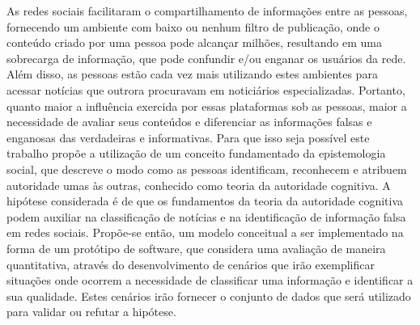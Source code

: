 \begin{resumo}

As redes sociais facilitaram o compartilhamento de informações entre as pessoas, fornecendo um ambiente com baixo ou nenhum filtro de publicação, onde o conteúdo criado por uma pessoa pode alcançar milhões, resultando em uma sobrecarga de informação, que pode confundir e/ou enganar os usuários da rede. Além disso, as pessoas estão cada vez mais utilizando estes ambientes para acessar notícias que outrora procuravam em noticiários especializadas. Portanto, quanto maior a influência exercida por essas plataformas sob as pessoas, maior a necessidade de avaliar seus conteúdos e diferenciar as informações falsas e enganosas das verdadeiras e informativas. Para que isso seja possível este trabalho propõe a utilização de um conceito fundamentado da epistemologia social, que descreve o modo como as pessoas identificam, reconhecem e atribuem autoridade umas às outras, conhecido como teoria da autoridade cognitiva. A hipótese considerada é de que os fundamentos da teoria da autoridade cognitiva podem auxiliar na classificação de notícias e na identificação de informação falsa em redes sociais. Propõe-se então, um modelo conceitual a ser implementado na forma de um protótipo de software, que considera uma avaliação de maneira quantitativa, através do desenvolvimento de cenários que irão exemplificar situações onde ocorrem a necessidade de classificar uma informação e identificar a sua qualidade. Estes cenários irão fornecer o conjunto de dados que será utilizado para validar ou refutar a hipótese.

\end{resumo}

